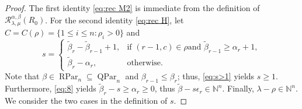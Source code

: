 \documentclass[12pt]{amsart}
\numberwithin{equation}{section}
\theoremstyle{definition}
\newcommand\wb{\widetilde{\beta}}
\newcommand\NN{\mathbb{N}}
\newcommand\RPar{\operatorname{RPar}}
\newcommand\QPar{\operatorname{QPar}}
\newcommand\R{\mathcal{R}}
\begin{document}
\begin{proof}
  The first identity \eqref{eq:rec M2} is immediate from the definition of
  $\R^{\alpha,\beta}_{\lambda,\mu}(R_0)$. For the second identity \eqref{eq:rec
    H}, let $C=C(\rho)=\{1\le i\le n: \rho_i>0\}$ and
    \[
s = \begin{cases}
  \wb_r-\wb_{r-1}+1, & \mbox{if $(r-1,c)\in\rho$
  and $\wb_{r-1}\ge\alpha_r+1$} ,\\
\wb_r-\alpha_r, &\mbox{otherwise} . 
\end{cases}
  \]
  Note that $\beta \in \RPar_n \subseteq \QPar_n$ and
  $\beta_{r-1} \leq \beta_r$; thus, \eqref{eq:s>1} yields
  $s \ge 1$.
  Furthermore, \eqref{eq:8} yields
  $\wb_r - s \ge \alpha_r \ge 0$, thus
  $\wb - s \epsilon_r \in \NN^n$. Finally,
  $\lambda - \rho \in \NN^n$.
  We consider the two cases in the definition of $s$.


\end{proof}
\end{document}
